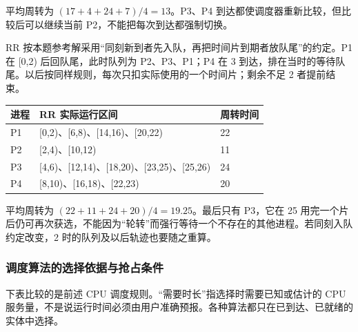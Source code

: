 平均周转为 \((17+4+24+7)/4=13\)。P3、P4 到达都使调度器重新比较，但比较后可以继续当前 P2，不能把每次到达都强制切换。

RR 按本题参考解采用``同刻新到者先入队，再把时间片到期者放队尾''的约定。P1 在 {[}0,2) 后回队尾，此时队列为 P2、P3、P1；P4 在 3 到达，排在当时的等待队尾。以后按同样规则，每次只扣实际使用的一个时间片；剩余不足 2 者提前结束。

\begin{wideblock}

\par\medskip\noindent\begin{minipage}{\linewidth}\fontsize{9.3}{12}\selectfont\begin{tabularx}{\linewidth}{@{}YYY@{}}
\toprule\noalign{}
进程 & RR 实际运行区间 & 周转时间 \\
\midrule\noalign{}


P1 & {[}0,2)、{[}6,8)、{[}14,16)、{[}20,22) & 22 \\
P2 & {[}2,4)、{[}10,12) & 11 \\
P3 & {[}4,6)、{[}12,14)、{[}18,20)、{[}23,25)、{[}25,26) & 24 \\
P4 & {[}8,10)、{[}16,18)、{[}22,23) & 20 \\
\bottomrule\end{tabularx}
\end{minipage}\par\medskip

\end{wideblock}

平均周转为 \((22+11+24+20)/4=19.25\)。最后只有 P3，它在 25 用完一个片后仍可再次获选，不能因为``轮转''而强行等待一个不存在的其他进程。若同刻入队约定改变，2 时的队列及以后轨迹也要随之重算。

\subsubsection{调度算法的选择依据与抢占条件}\label{OS02-auto-4}

下表比较的是前述 CPU 调度规则。``需要时长''指选择时需要已知或估计的 CPU 服务量，不是说运行时间必须由用户准确预报。各种算法都只在已到达、已就绪的实体中选择。

